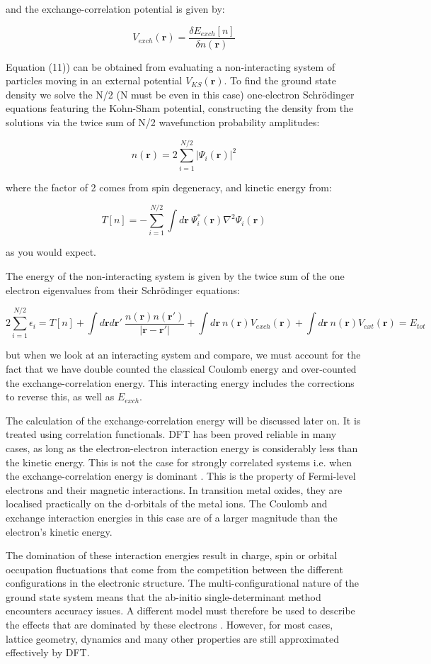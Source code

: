 \documentclass[10pt]{article}
\begin{document}
and the exchange-correlation potential is given by:

$$V_{exch}(\mathbf{r}) = \frac{\delta E_{exch}[n]}{\delta n(\mathbf{r})}$$

Equation (11)) can be obtained from evaluating a non-interacting system of particles moving in an external potential $V_{KS}(\mathbf{r})$. To find the ground state density we solve the N/2 (N must be even in this case) one-electron Schrödinger equations featuring the Kohn-Sham potential, constructing the density from the solutions via the twice sum of N/2 wavefunction probability amplitudes:

$$n(\mathbf{r}) = 2\sum_{i=1}^{N/2}|\Psi_i(\mathbf{r})|^2$$

where the factor of 2 comes from spin degeneracy, and kinetic energy from:

$$T[n] = -\sum_{i=1}^{N/2}\int d\mathbf{r} \ \Psi_i^*(\mathbf{r})\nabla^2\Psi_i(\mathbf{r})$$

as you would expect.

The energy of the non-interacting system is given by the twice sum of the one electron eigenvalues from their Schrödinger equations:

$$2\sum_{i=1}^{N/2}\epsilon_i = T[n]+\int d\mathbf{r}d\mathbf{r}' \ \frac{n(\mathbf{r})n(\mathbf{r}')}{|\mathbf{r}-\mathbf{r}'|} +\int d\mathbf{r} \ n(\mathbf{r})V_{exch}(\mathbf{r}) + \int d\mathbf{r} \ n(\mathbf{r})V_{ext}(\mathbf{r}) = E_{tot}$$

but when we look at an interacting system and compare, we must account for the fact that we have double counted the classical Coulomb energy and over-counted the exchange-correlation energy. This interacting energy includes the corrections to reverse this, as well as $E_{exch}$.

The calculation of the exchange-correlation energy will be discussed later on. It is treated using correlation functionals. DFT has been proved reliable in many cases, as long as the electron-electron interaction energy is considerably less than the kinetic energy. This is not the case for strongly correlated systems i.e. when the exchange-correlation energy is dominant \cite{pickett1989electronic}. This is the property of Fermi-level electrons and their magnetic interactions. In transition metal oxides, they are localised practically on the d-orbitals of the metal ions. The Coulomb and exchange interaction energies in this case are of a larger magnitude than the electron's kinetic energy.

The domination of these interaction energies result in charge, spin or orbital occupation fluctuations that come from the competition between the different configurations in the electronic structure. The multi-configurational nature of the ground state system means that the ab-initio single-determinant method encounters accuracy issues. A different model must therefore be used to describe the effects that are dominated by these electrons \cite{gelle2009accurate}. However, for most cases, lattice geometry, dynamics and many other properties are still approximated effectively by DFT.
\end{document}
